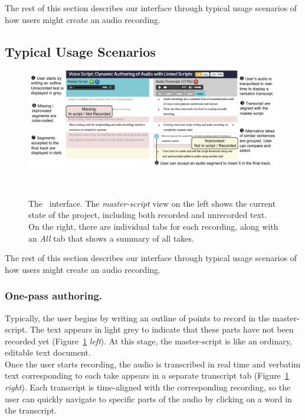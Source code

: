 The rest of this section describes our interface through typical usage scenarios of how users might create an audio recording. 
%
\subsection{Typical Usage Scenarios}
%
\begin{figure}
  \centering
  \includegraphics[width=\textwidth]{figures/ui_aligned2}
  \caption{The \voicescript\ interface. The \textit{master-script} view on the left shows the current state of the project, including both recorded and unrecorded text. On the right, there are individual tabs for each recording, along with an \textit{All} tab that shows a summary of all takes.}~\label{fig:ui_aligned}
\end{figure}
%
The rest of this section describes our interface through typical usage scenarios of how users might create an audio recording. 

\subsubsection{One-pass authoring.} 
Typically, the user begins by writing an outline of points to record in the master-script.
The text appears in light grey to indicate that these parts have not been recorded yet (Figure~\ref{fig:ui_aligned} \textit{left}). At this stage, the master-script is like an ordinary, editable text document. \\

Once the user starts recording, the audio is transcribed in real time and verbatim text corresponding to each take appears in a separate transcript tab (Figure~\ref{fig:ui_aligned} \textit{right}). Each transcript is time-aligned with the corresponding recording, so the user can quickly navigate to specific
parts of the audio by clicking on a word in the transcript. \\

